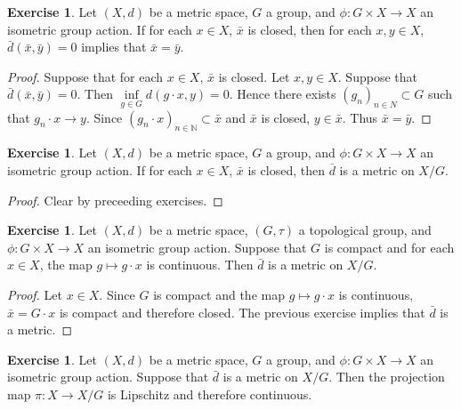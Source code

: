 \documentclass[12pt]{amsart}
\theoremstyle{definition}
\newtheorem{ex}[definition]{Exercise}
\newcommand{\N}{\mathbb{N}}
\newcommand{\lex}[1]{\label{ex:#1}}
\begin{document}
	\begin{ex} \lex{}
	Let $(X, d)$ be a metric space, $G$ a group, and $\phi: G \times X \rightarrow X$ an isometric group action. If for each $x \in X$, $\bar{x}$ is closed, then for each $x, y \in X$, $\bar{d}(\bar{x}, \bar{y}) =0$ implies that $\bar{x} = \bar{y}$.
	\end{ex}
	
	\begin{proof}
	Suppose that for each $x \in X$, $\bar{x}$ is closed. Let $x,y \in X$. Suppose that $\bar{d}(\bar{x} , \bar{y}) = 0$. Then $\inf\limits_{ g \in G} d(g \cdot x, y) = 0$. Hence there exists $(g_n)_{n \in N} \subset G$ such that $g_n \cdot x \rightarrow y$. Since $(g_n \cdot x)_{n \in \N} \subset \bar{x}$ and $\bar{x}$ is closed, $y \in \bar{x}$. Thus $\bar{x} = \bar{y}$. 
	\end{proof}
	
	\begin{ex} \lex{}
	Let $(X, d)$ be a metric space, $G$ a group, and $\phi: G \times X \rightarrow X$ an isometric group action. If for each $x \in X$, $\bar{x}$ is closed, then $\bar{d}$ is a metric on $X/G$.
	\end{ex}
	
	\begin{proof}
	Clear by preceeding exercises.
	\end{proof}
	
	\begin{ex} \lex{}
	Let $(X, d)$ be a metric space, $(G, \tau)$ a topological group, and $\phi: G \times X \rightarrow X$ an isometric group action. Suppose that $G$ is compact and for each $x \in X$, the map $g \mapsto g \cdot x$ is continuous. Then $\bar{d}$ is a metric on $X/G$. 
	\end{ex}
	
	\begin{proof}
	Let $x \in X$. Since $G$ is compact and the map $g \mapsto g \cdot x$ is continuous, $\bar{x} = G \cdot x$ is compact and therefore closed. The previous exercise implies that $\bar{d}$ is a metric.
	\end{proof}
	
	\begin{ex} \lex{}
	Let $(X, d)$ be a metric space, $G$ a group, and $\phi: G \times X \rightarrow X$ an isometric group action. Suppose that $\bar{d}$ is a metric on $X/G$. Then the projection map $\pi: X \rightarrow X/G$ is Lipschitz and therefore continuous.
	\end{ex}
	
\end{document}
